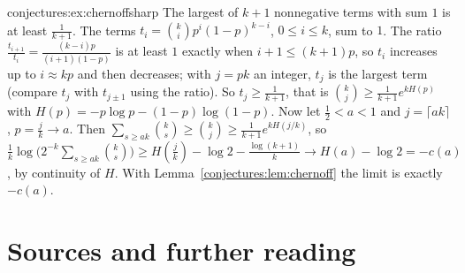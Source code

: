 \begin{solution}{conjectures:ex:chernoffsharp}
\idea The largest of $k+1$ nonnegative terms with sum $1$ is at least $\frac1{k+1}$.
\writeup The terms $t_i=\binom kip^i(1-p)^{k-i}$, $0\le i\le k$, sum to $1$. The ratio $\frac{t_{i+1}}{t_i}=\frac{(k-i)p}{(i+1)(1-p)}$ is at least $1$
exactly when $i+1\le(k+1)p$, so $t_i$ increases up to $i\approx kp$ and then decreases; with $j=pk$ an integer, $t_j$ is the largest term (compare
$t_{j}$ with $t_{j\pm1}$ using the ratio). So $t_j\ge\frac1{k+1}$, that is $\binom kj\ge\frac1{k+1}e^{kH(p)}$ with $H(p)=-p\log p-(1-p)\log(1-p)$. Now let
$\frac12<a<1$ and $j=\lceil ak\rceil$, $p=\frac jk\to a$. Then $\sum_{s\ge ak}\binom ks\ge\binom kj\ge\frac1{k+1}e^{kH(j/k)}$, so
$\frac1k\log\bigl(2^{-k}\sum_{s\ge ak}\binom ks\bigr)\ge H(\tfrac jk)-\log2-\frac{\log(k+1)}k\to H(a)-\log2=-c(a)$, by continuity of $H$. With
Lemma~\ref{conjectures:lem:chernoff} the limit is exactly $-c(a)$.
\end{solution}

\section*{Sources and further reading}

